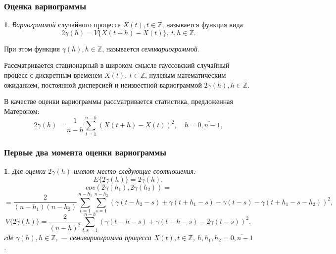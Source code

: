 \documentclass[10pt,pdf,aspectratio=169,hyperref={unicode},notheorems]{beamer}
\newtheorem{theorem}{\translate{Theorem}}[section]
\newtheorem{theorem}{\translate{Theorem}}
\theoremstyle{definition}
\newtheorem{definition}{\translate{Definition}}
\theoremstyle{example}
\theoremstyle{plain}
\newenvironment{Theorem}{\begin{theorem}}{\end{theorem}}
\newenvironment{Definition}{\begin{definition}}{\end{definition}}
\begin{document}
\begin{frame}
  \frametitle{Оценка вариограммы}
  \begin{Definition}
    \textit{Вариограммой} случайного процесса $ X(t), t \in \mathbb{Z} $, называется функция вида
    \begin{equation}
    \label{eq:matheron}
        2 \gamma (h) = V \{ X(t + h) - X(t) \},~ t, h \in \mathbb{Z}.
    \end{equation}

    При этом функция $ \gamma (h), h \in \mathbb{Z} $, называется \textit{семивариограммой}.
  \end{Definition}

  \vspace{0.5em}

  Рассматривается стационарный в широком смысле гауссовский случайный процесс с дискретным временем $ X(t),~ t \in \mathbb{Z} $, нулевым математическим ожиданием, постоянной дисперсией и неизвестной вариограммой $ 2 \gamma(h), h \in \mathbb{Z} $.

  \vspace{0.5em}

  В качестве оценки вариограммы рассматривается статистика, предложенная Матероном:
  \begin{equation}
    2 \tilde{\gamma}(h) = \frac{1}{n - h} \sum_{t = 1}^{n - h}(X(t + h) - X(t))^2, \quad h = \overline{0, n - 1},
  \end{equation}
\end{frame}

\begin{frame}
  \frametitle{Первые два момента оценки вариограммы}
\begin{Theorem}
  Для оценки $ 2 \tilde{\gamma}(h) $ имеют место следующие соотношения:
  \begin{equation*}
    E \{2 \tilde{\gamma}(h) \} = 2 \gamma(h), %
  \end{equation*}
  \begin{equation*}
    cov(2 \tilde{\gamma}(h_1), 2 \tilde{\gamma}(h_2)) =
  \end{equation*}
  \begin{equation*}
    = \frac{2}{(n - h_1)(n - h_2)} \sum_{t = 1}^{n - h_1}\sum_{s = 1}^{n - h_2} (\gamma(t - h_2 - s) + \gamma(t + h_1 - s) - \gamma(t - s) - \gamma(t + h_1 - s - h_2))^2,
  \end{equation*}
  \begin{equation*}
    V \{ 2 \tilde{\gamma}(h) \} = \frac{2}{(n-h)^2}\sum_{t,s = 1}^{n - h} ( \gamma(t - h - s) + \gamma(t + h - s) - 2\gamma(t - s) )^2,
  \end{equation*}
  где $ \gamma(h), h \in \mathbb{Z} $, --- семивариограмма процесса $ X(t), t \in \mathbb{Z}$, $ h, h_1, h_2 = \overline{0, n - 1} $.
\end{Theorem}
\end{frame}
\end{document}
